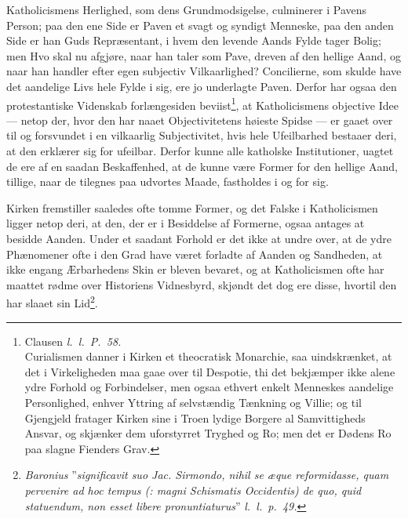 \documentclass[12pt]{book}
\newcommand{\dsi}{\reflectbox{c}:}
\newcommand{\opage}[1]{\marginnote{\footnotesize\textit{[#1]}}}
\begin{document}
Katholicismens Herlighed, som dens Grundmodsigelse, culminerer i Pavens Person;
paa den ene Side er Paven et svagt og syndigt Menneske, paa den anden Side er han
Guds Repræsentant, i hvem den levende Aands Fylde tager Bolig; men Hvo skal nu
afgjøre, naar han taler som Pave, dreven af den hellige Aand, og naar han handler
efter egen subjectiv Vilkaarlighed? Concilierne, som skulde have det aandelige
Livs hele Fylde i sig, ere jo underlagte Paven. Derfor har ogsaa den
protestantiske Videnskab forlængesiden beviist\footnote{Clausen \textit{l.\ l.\
P.\ 58.}\\
Curialismen danner i Kirken et theocratisk Monarchie, saa uindskrænket, at det i
Virkeligheden maa gaae over til Despotie, thi det bekjæmper ikke alene ydre
Forhold og Forbindelser, men ogsaa ethvert enkelt Menneskes aandelige
Personlighed, enhver Yttring af selvstændig Tænkning og Villie; og til Gjengjeld
fratager Kirken sine i Troen lydige Borgere al Samvittigheds Ansvar, og skjænker
dem uforstyrret Tryghed og Ro; men det er Dødens Ro paa slagne Fienders Grav.},
at Katholicismens objective Idee --- netop der, hvor den har naaet
Objectivitetens høieste Spidse --- er gaaet over til og forsvundet i en
vilkaarlig Subjectivitet, hvis hele Ufeilbarhed bestaaer deri, at den erklærer
sig for ufeilbar. Derfor kunne
\opage{60} \setcounter{footnote}{0}%
alle katholske Institutioner, uagtet de ere af en saadan Beskaffenhed, at de
kunne være Former for den hellige Aand, tillige, naar de tilegnes paa udvortes
Maade, fastholdes i og for sig.

Kirken fremstiller saaledes ofte tomme Former, og det Falske i Katholicismen
ligger netop deri, at den, der er i Besiddelse af Formerne, ogsaa antages at
besidde Aanden. Under et saadant Forhold er det ikke at undre over, at de ydre
Phænomener ofte i den Grad have været forladte af Aanden og Sandheden, at ikke
engang Ærbarhedens Skin er bleven bevaret, og at Katholicismen ofte har maattet
rødme over Historiens Vidnesbyrd, skjøndt det dog ere disse, hvortil den har
slaaet sin Lid\footnote{\textit{Baronius} ”\textit{significavit suo Jac.
Sirmondo, nihil se æque reformidasse, quam pervenire ad hoc tempus (\dsi{} magni
Schismatis Occidentis) de quo, quid statuendum, non esset libere
pronuntiaturus}” \textit{l.\ l.\ p.\ 49.}}.
\end{document}
